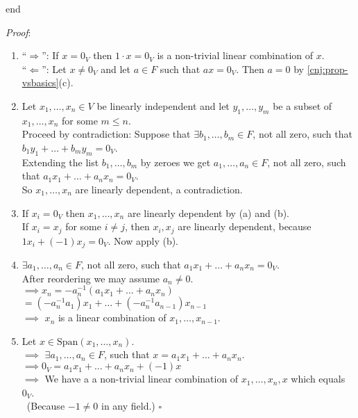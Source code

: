 \documentclass[
  12pt,
  a4paper,
  twoside]{article}
\theoremstyle{plain}
\theoremstyle{definition}
\begin{document}
\csname end

\emph{Proof}:

\begin{enumerate}
\def\labelenumi{(\alph{enumi})}
\item
  ``\(\Rightarrow\)'': If \(x=0_{V}\) then \(1 \cdot x = 0_{V}\) is a non-trivial linear combination of \(x\).\\
  ``\(\Leftarrow\)'': Let \(x \neq 0_{V}\) and let \(a \in F\) such that \(ax = 0_{V}\). Then \(a=0\) by \ref{cnj:prop-vsbasics}(c).
\item
  Let \(x_1, \dots, x_n \in V\) be linearly independent and let \(y_1, \dots, y_m\) be a subset of \(x_1, \dots, x_n\) for some \(m \leq n\).\\
  Proceed by contradiction: Suppose that \(\exists b_1, \dots, b_m \in F\), not all zero,
  such that \(b_1y_1 + \dots + b_my_m = 0_{V}\).\\
  Extending the list \(b_1, \dots, b_m\) by zeroes we get \(a_1, \dots, a_n \in F\), not all zero,
  such that \(a_1x_1 + \dots + a_nx_n = 0_{V}\).\\
  So \(x_1, \dots, x_n\) are linearly dependent, a contradiction.
\item
  If \(x_{i} = 0_{V}\) then \(x_1, \dots, x_n\) are linearly dependent by (a) and (b).\\
  If \(x_{i} = x_{j}\) for some \(i \neq j\), then \(x_{i}, x_{j}\) are linearly dependent, because \(1x_{i} + (-1)x_{j} = 0_{V}\). Now apply (b).
\item
  \(\exists a_1, \dots, a_n \in F\), not all zero, such that \(a_1x_1 + \dots + a_nx_n = 0_{V}\).\\
  After reordering we may assume \(a_n \neq 0\).\\
  \(\implies x_n = -a_n^{-1} (a_1x_1 + \dots + a_nx_n)\) \(= (-a_n^{-1} a_1)x_1 + \dots + (-a_n^{-1} a_{n-1})x_{n-1}\)\\
  \(\implies\) \(x_n\) is a linear combination of \(x_1, \dots, x_{n-1}\).
\item
  Let \(x\in\mathrm{Span}(x_1,\dots,x_n)\).\\
  \(\implies\) \(\exists a_1, \dots, a_n \in F\), such that \(x = a_1x_1 + \dots + a_nx_n\).\\
  \(\implies 0_{V} = a_1x_1 + \dots + a_nx_n + (-1)x\)\\
  \(\implies\) We have a a non-trivial linear combination of \(x_1, \dots, x_n,x\) which equals \(0_V\).\\
  \hspace*{0.333em}\hfill~{(Because \(-1\not=0\) in any field.) \(\square\)}
\end{enumerate}
\end{document}

